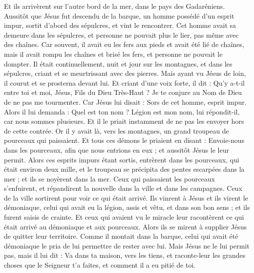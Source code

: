 \begin{multicols}{2}
\VerseOne{}Et ils arrivèrent sur l’autre bord de la mer, dans le pays des Gadaréniens.
Aussitôt que Jésus fut descendu de la barque, un homme possédé d’un esprit impur, sortit d'abord des sépulcres, et vint le rencontrer.
Cet homme avait sa demeure dans les sépulcres, et personne ne pouvait plus le lier, pas même avec des chaînes.
Car souvent, il avait eu les fers aux pieds et avait été lié de chaînes, mais il avait rompu les chaînes et brisé les fers, et personne ne pouvait le dompter.
Il était continuellement, nuit et jour sur les montagnes, et dans les sépulcres, criant et se meurtrissant avec des pierres.
Mais ayant vu Jésus de loin, il courut et se prosterna devant lui.
Et criant d’une voix forte, il dit : Qu'y a-t-il entre toi et moi, Jésus, Fils du Dieu Très-Haut ? Je te conjure au Nom de Dieu de ne pas me tourmenter.
Car Jésus lui disait : Sors de cet homme, esprit impur.
Alors il lui demanda : Quel est ton nom ? Légion est mon nom, lui répondit-il, car nous sommes plusieurs.
Et il le priait instamment de ne pas les envoyer hors de cette contrée.
Or il y avait là, vers les montagnes, un grand troupeau de pourceaux qui paissaient.
Et tous ces démons le priaient en disant : Envoie-nous dans les pourceaux, afin que nous entrions en eux ; et aussitôt Jésus le leur permit.
Alors ces esprits impurs étant sortis, entrèrent dans les pourceaux, qui était environ deux mille, et le troupeau se précipita des pentes escarpées dans la mer ; et ils se noyèrent dans la mer.
Ceux qui paissaient les pourceaux s'enfuirent, et répandirent la nouvelle dans la ville et dans les campagnes.
Ceux de la ville sortirent pour voir ce qui était arrivé. Ils vinrent à Jésus et ils virent le démoniaque, celui qui avait eu la légion, assis et vêtu, et dans son bon sens ; et ils furent saisis de crainte.
Et ceux qui avaient vu le miracle leur racontèrent ce qui était arrivé au démoniaque et aux pourceaux.
Alors ils se mirent à supplier Jésus de quitter leur territoire.
Comme il montait dans la barque, celui qui avait été démoniaque le pria de lui permettre de rester avec lui.
Mais Jésus ne le lui permit pas, mais il lui dit : Va dans ta maison, vers les tiens, et raconte-leur les grandes choses que le Seigneur t'a faites, et comment il a eu pitié de toi.

\end{multicols}

